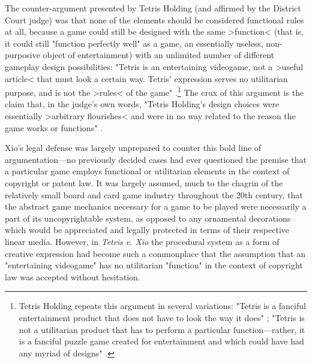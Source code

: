The counter-argument presented by Tetris Holding (and affirmed by the District Court judge) was that none of the elements should be considered functional rules at all, because a game could still be designed with the same >function< (that is, it could still "function perfectly well" as a game, an essentially useless, non-purposive object of entertainment) with an unlimited number of different gameplay design possibilities: "Tetris is an entertaining videogame, not a >useful article< that must look a certain way. Tetris' expression serves no utilitarian purpose, and is not the >rules< of the game" \autocite[2]{tetris-reply}.\footnote{
  Tetris Holding repeats this argument in several variations: "Tetris is a fanciful entertainment product that does not have to look the way it does" \autocite[8]{tetris-reply}; "Tetris is not a utilitarian product that has to perform a particular function---rather, it is a fanciful puzzle game created for entertainment and which could have had any myriad of designs" \autocite[11]{tetris-reply}.
}
The crux of this argument is the claim that, in the judge's own words, "Tetris Holding's design choices were essentially >arbitrary flourishes< and were in no way related to the reason the game works or functions" \autocite[416]{tetris-xio}.

Xio's legal defense was largely unprepared to counter this bold line of argumentation---no previously decided cases had ever questioned the premise that a particular game employs functional or utilitarian elements in the context of copyright or patent law. It was largely assumed, much to the chagrin of the relatively small board and card game industry throughout the 20th century, that the abstract game mechanics necessary for a game to be played were necessarily a part of its uncopyrightable system, as opposed to any ornamental decorations which would be appreciated and legally protected in terms of their respective linear media. However, in \emph{Tetris v. Xio} the procedural system as a form of creative expression had become such a commonplace that the assumption that an "entertaining videogame" has no utilitarian "function" in the context of copyright law was accepted without hesitation.

